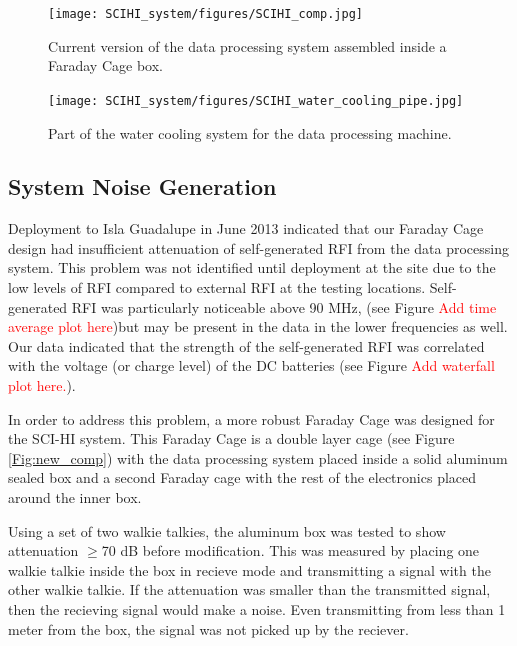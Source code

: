 \begin{figure}[htb]
\centering
\begin{minipage}[b]{0.52\textwidth}
\centering
\texttt{[image: SCIHI\_system/figures/SCIHI\_comp.jpg]}
\caption{Current version of the data processing system assembled inside a Faraday Cage box.}
\label{Fig:new_comp}
\end{minipage}%
\begin{minipage}[b]{0.02\textwidth}
\hspace{1cm}
\end{minipage}%
\begin{minipage}[b]{0.42\textwidth}
\centering
\texttt{[image: SCIHI\_system/figures/SCIHI\_water\_cooling\_pipe.jpg]}
\caption{Part of the water cooling system for the data processing machine.}
\label{Fig:water_pipe}
\end{minipage}
\end{figure}

\subsection{System Noise Generation}
Deployment to Isla Guadalupe in June 2013 indicated that our Faraday Cage design had insufficient attenuation of self-generated RFI from the data processing system. This problem was not identified until deployment at the site due to the low levels of RFI compared to external RFI at the testing locations. Self-generated RFI was particularly noticeable above 90 MHz, (see Figure \textcolor{red}{Add time average plot here})but may be present in the data in the lower frequencies as well. Our data indicated that the strength of the self-generated RFI was correlated with the voltage (or charge level) of the DC batteries (see Figure \textcolor{red}{Add waterfall plot here.}). 

In order to address this problem, a more robust Faraday Cage was designed for the SCI-HI system. This Faraday Cage is a double layer cage (see Figure \ref{Fig:new_comp}) with the data processing system placed inside a solid aluminum sealed box and a second Faraday cage with the rest of the electronics placed around the inner box. 

Using a set of two walkie talkies, the aluminum box was tested to show attenuation $\geq$70 dB before modification. This was measured by placing one walkie talkie inside the box in recieve mode and transmitting a signal with the other walkie talkie. If the attenuation was smaller than the transmitted signal, then the recieving signal would make a noise. Even transmitting from less than 1 meter from the box, the signal was not picked up by the reciever. 

